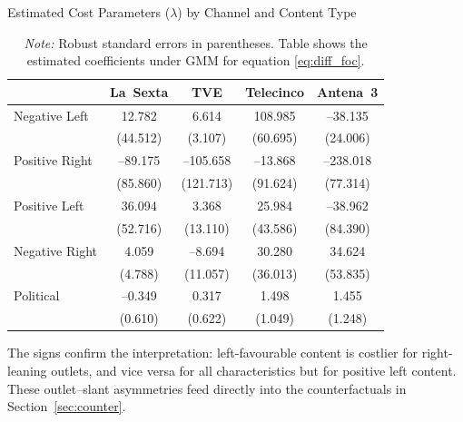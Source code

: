 \documentclass[12pt]{article}
\begin{document}
\begin{table}[ht!]
	\caption{Estimated Cost Parameters ($\lambda$) by Channel and Content Type}
	\label{table:costs}
	\centering\small
	\begin{tabular}{lcccc}
		\toprule
		& La~Sexta & TVE & Telecinco & Antena~3 \\
		\midrule
		Negative Left   
		& 12.782   &  6.614   & 108.985   & --38.135  \\
		& (44.512) & (3.107)  & (60.695)  & (24.006)  \\
				\midrule
		Positive Right  
		& --89.175 & --105.658 & --13.868  & --238.018 \\
		& (85.860) & (121.713) & (91.624)  & (77.314)  \\
		\midrule
		Positive Left   
		& 36.094   &  3.368   &  25.984   & --38.962  \\
		& (52.716) & (13.110) & (43.586)  & (84.390)  \\
				\midrule
		Negative Right  
		&  4.059   & --8.694  &  30.280   &  34.624   \\
		& (4.788)  & (11.057) & (36.013)  & (53.835)  \\
		\midrule
		Political 
		& --0.349  &  0.317   &   1.498   &   1.455   \\
		& (0.610)  & (0.622)  &  (1.049)  &  (1.248)  \\
		\bottomrule
	\end{tabular}
	\vspace{0.5em}
	\caption*{\scriptsize\emph{Note:} Robust standard errors in parentheses. Table shows the estimated coefficients under GMM for equation \ref{eq:diff_foc}.}
\end{table}



The signs confirm the interpretation: left-favourable content is costlier for right-leaning outlets, and vice versa for all characteristics but for positive left content. 
These outlet–slant asymmetries feed directly into the counterfactuals in Section~\ref{sec:counter}.
\end{document}
